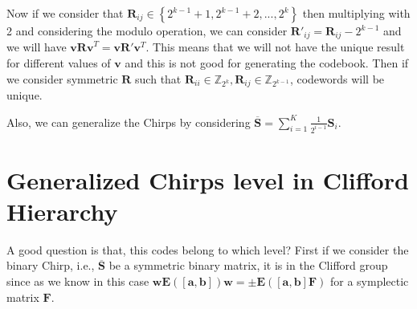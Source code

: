 \noindent Now if we consider that $\mathbf{R}_{ij}\in \left\{ 2^{k-1}+1,2^{k-1}+2,...,2^{k}\right\}$ then multiplying with 2 and considering the modulo operation, we can consider $\mathbf{R}'_{ij}=\mathbf{R}_{ij}-2^{k-1}$ and we will have $\mathbf{v R v}^T = \mathbf{v}\mathbf{R}'\mathbf{v}^T$. This means that we will not have the unique result for different values of $\mathbf{v}$ and this is not good for generating the codebook. Then if we consider symmetric $\mathbf{R}$ such that $\mathbf{R}_{ii}\in \mathbb{Z}_{2^k}, \mathbf{R}_{ij}\in \mathbb{Z}_{2^{k-1}}$, codewords will be unique.    


Also, we can generalize the Chirps by considering $\overline{\mathbf{S}}=\sum_{i=1}^K{\frac{1}{2^{i-1}} \mathbf{S}_i}$.
\section{Generalized Chirps level in Clifford Hierarchy}
A good question is that, this codes belong to which level? First if we consider the binary Chirp, i.e., $\overline{\mathbf{S}}$ be a symmetric binary matrix, it is in the Clifford group since as we know in this case $\mathbf{w}\mathbf{E}\left(\left[ \mathbf{a, b}\right]\right)\mathbf{w} = \pm \mathbf{E}\left(\left[\mathbf{a,b}\right]\mathbf{F}\right)$ for a symplectic matrix $\mathbf{F}$. 

